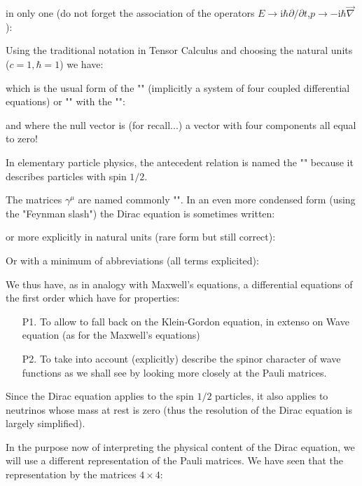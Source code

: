 	in only one (do not forget the association of the operators $E\rightarrow \mathrm{i}\hbar\partial/\partial t$,$p\rightarrow -\mathrm{i}\hbar\vec{\nabla}$):
	
	Using the traditional notation in Tensor Calculus and choosing the natural units ($c=1,\hbar=1$) we have:
	
	which is the usual form of the "\label{dirac equation}" (implicitly a system of four coupled differential equations) or "" with the "":
	
	and where the null vector is (for recall...) a vector with four components all equal to zero!
	\begin{tcolorbox}[title=Remark,colframe=black,arc=10pt]
	In elementary particle physics, the antecedent relation is named the "" because it describes particles with spin $1/2$.
	\end{tcolorbox}
	The matrices $\gamma^\mu$ are named commonly "". In an even more condensed form (using the "Feynman slash") the Dirac equation is sometimes written:
	
	or more explicitly in natural units (rare form but still correct):
	
	Or with a minimum of abbreviations (all terms explicited):
	
	
	We thus have, as in analogy with Maxwell's equations, a differential equations of the first order which have for properties:
	\begin{enumerate}
		\item[P1.] To allow to fall back on the Klein-Gordon equation, in extenso on Wave equation (as for the Maxwell's equations)

		\item[P2.] To take into account (explicitly) describe the spinor character of wave functions as we shall see by looking more closely at the Pauli matrices.
	\end{enumerate}
	\begin{tcolorbox}[title=Remark,colframe=black,arc=10pt]
	Since the Dirac equation applies to the spin $1/2$ particles, it also applies to neutrinos whose mass at rest is zero (thus the resolution of the Dirac equation is largely simplified).
	\end{tcolorbox}
	In the purpose now of interpreting the physical content of the Dirac equation, we will use a different representation of the Pauli matrices. We have seen that the representation by the matrices $4\times 4$:
	
